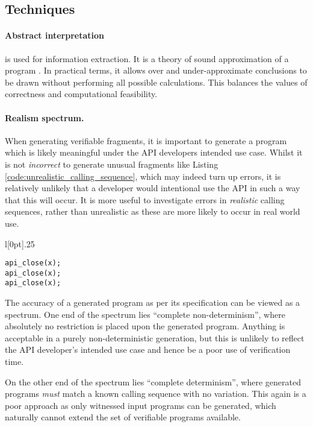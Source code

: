 \documentclass[EPiCempty]{easychair}
\begin{document}
\subsection{Techniques}
\paragraph{Abstract interpretation} is used for information extraction.  It is a theory of sound approximation of a program \cite{DBLP:conf/popl/CousotC77}. In practical terms, it allows over and under-approximate conclusions to be drawn without performing all possible calculations.  This balances the values of correctness and computational feasibility. 


\paragraph{Realism spectrum.}
\label{sec:realism_spectrum}
When generating verifiable fragments, it is important to generate a program which is likely meaningful under the API developers intended use case.  Whilst it is not \textit{incorrect} to generate unusual fragments like Listing \ref{code:unrealistic_calling_sequence}, which may indeed turn up errors, it is relatively unlikely that a developer would intentional use the API in such a way that this will occur.  It is more useful to investigate errors in \textit{realistic} calling sequences, rather than unrealistic as these are more likely to occur in real world use. 


\begin{wrapfigure}[7]{l}[0pt]{.25\textwidth}
	\begin{lstlisting}[caption={An unrealistic calling sequence.}, numbers=none, label={code:unrealistic_calling_sequence}]
api_close(x);
api_close(x);
api_close(x);
	\end{lstlisting}
\end{wrapfigure}

The accuracy of a generated program as per its specification can be viewed as a spectrum.  One end of the spectrum lies \enquote{complete non-determinism}, where absolutely no restriction is placed upon the generated program.  Anything is acceptable in a purely non-deterministic generation, but this is unlikely to reflect the API developer's intended use case and hence be a poor use of verification time.

On the other end of the spectrum lies \enquote{complete determinism}, where generated programs \textit{must} match a known calling sequence with no variation.  This again is a poor approach as only witnessed input programs can be generated, which naturally cannot extend the set of verifiable programs available.
\end{document}
